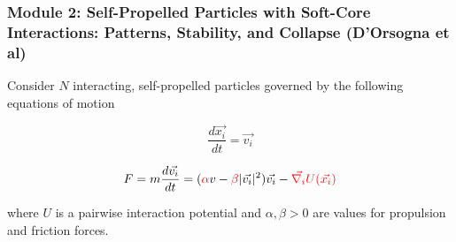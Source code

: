 \documentclass[compress]{beamer}
\begin{document}
\begin{frame}
  \frametitle{Module 2: Self-Propelled Particles with Soft-Core Interactions: Patterns, Stability, and Collapse (D'Orsogna et al)}
	
%	  
	  
	Consider \( N \) interacting, self-propelled particles governed by the following equations of motion
	
	
	
	
\begin{equation}
		\frac{d\vec{x_{i}}}{d t} = \vec{v_{i}}
\end{equation}

\begin{equation}
		    F = m  \frac{d\vec{v_{i}}}{d t} = (\textcolor{red}{\alpha}v- \textcolor{red}{\beta} |\vec{v_{i}}|^{2}) \vec{v_{i}} - \textcolor{red}{\vec{\nabla_{i}} U(\vec{x_{i}})}
\end{equation}

	
	where \( U \) is a pairwise interaction potential and \( \alpha, \beta > 0\) are values for propulsion and friction forces.\\

\end{frame}
\end{document}
